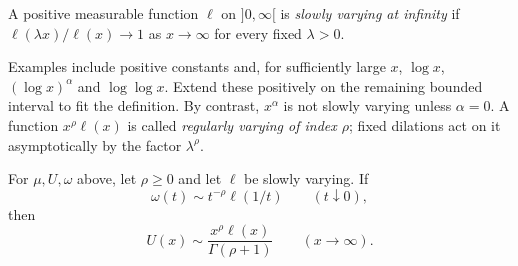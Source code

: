 \begin{definition}
A positive measurable function $\ell$ on $]0,\infty[$ is \emph{slowly varying at infinity} if $\ell(\lambda x)/\ell(x)\to1$ as $x\to\infty$ for every fixed $\lambda>0$.
\end{definition}

Examples include positive constants and, for sufficiently large $x$, $\log x$, $(\log x)^\alpha$ and $\log\log x$. Extend these positively on the remaining bounded interval to fit the definition. By contrast, $x^\alpha$ is not slowly varying unless $\alpha=0$. A function $x^\rho\ell(x)$ is called \emph{regularly varying of index $\rho$}; fixed dilations act on it asymptotically by the factor $\lambda^\rho$.

\begin{theorem}\label{thm:karamata}
For $\mu,U,\omega$ above, let $\rho\ge0$ and let $\ell$ be slowly varying. If
\[\omega(t)\sim t^{-\rho}\ell(1/t)\qquad(t\downarrow0),\]
then
\[U(x)\sim\frac{x^\rho\ell(x)}{\Gamma(\rho+1)}\qquad(x\to\infty).\]
\end{theorem}
